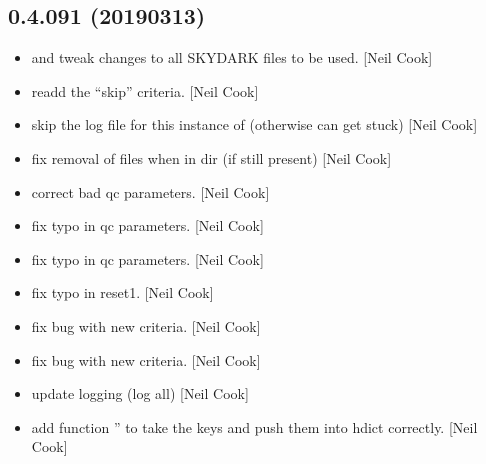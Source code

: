 \documentclass[a4paper,10pt,english]{report}
\begin{document}
\subsection{0.4.091 (2019\sphinxhyphen{}03\sphinxhyphen{}13)}
\label{\detokenize{misc/changelog:id187}}\begin{itemize}
\item {} 
 and  \sphinxhyphen{} tweak changes to all SKYDARK
files to be used. {[}Neil Cook{]}

\item {} 
 \sphinxhyphen{} readd the “skip” criteria. {[}Neil Cook{]}

\item {} 
 \sphinxhyphen{} skip the log file for this instance of 
(otherwise can get stuck) {[}Neil Cook{]}

\item {} 
 \sphinxhyphen{} fix removal of files when in dir (if still present)
{[}Neil Cook{]}

\item {} 
 \sphinxhyphen{} correct bad qc parameters. {[}Neil Cook{]}

\item {} 
 \sphinxhyphen{} fix typo in qc parameters. {[}Neil Cook{]}

\item {} 
 \sphinxhyphen{} fix typo in qc parameters. {[}Neil Cook{]}

\item {} 
 \sphinxhyphen{} fix typo in reset1. {[}Neil Cook{]}

\item {} 
 \sphinxhyphen{} fix bug with new  criteria. {[}Neil
Cook{]}

\item {} 
 \sphinxhyphen{} fix bug with new  criteria. {[}Neil
Cook{]}

\item {} 
 \sphinxhyphen{} update logging (log all) {[}Neil Cook{]}

\item {} 
 \sphinxhyphen{} add function ” to take the keys and push
them into hdict correctly. {[}Neil Cook{]}


\end{itemize}
\end{document}
